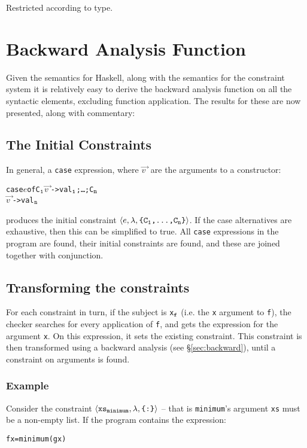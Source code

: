 \documentclass[preprint]{sigplanconf}
\newcommand{\T}[1]{\texttt{#1}}
\newcommand{\tup}[1]{\ensuremath{\langle #1 \rangle}}
\newcounter{exmp}
\newcommand{\yesexample}{\subsubsection*{Example \arabic{exmp}}\addtocounter{exmp}{1}}
\newenvironment{code}{\begin{alltt}\small}{\end{alltt}}
\renewcommand{\c}[3]{\tup{\T{#1},\T{#2},\T{\{#3\}}}}
\newcommand{\cc}[2]{\c{#1}{$\lambda$}{#2}}
\newcommand{\s}[1]{\ensuremath{_{\tt #1}}} %
\newcommand{\vecto}[1]{\overrightarrow{#1\;}}
\begin{document}
Restricted according to type.

\section{Backward Analysis Function}
\label{chap:backward}

Given the semantics for Haskell, along with the semantics for the constraint
system it is relatively easy to derive the backward analysis function on all
the syntactic elements, excluding function application. The results for these
are now presented, along with commentary:

\subsection{The Initial Constraints}

In general, a \T{case} expression, where $\vecto{v}$ are the
arguments to a constructor:

\begin{code}
case \(e\) of {C\s{1} \(\vecto{v}\) -> val\s{1}; \ldots; C\s{n}
\(\vecto{v}\) -> val\s{n}}
\end{code}

\noindent produces the initial constraint
\cc{$e$}{C\s{1},\ldots,C\s{n}}. If the case alternatives are
exhaustive, then this can be simplified to true. All \T{case}
expressions in the program are found, their initial constraints are
found, and these are joined together with conjunction.

\subsection{Transforming the constraints}

For each constraint in turn, if the subject is \T{x\s{f}} (i.e. the
\T{x} argument to \T{f}), the checker searches for every application
of \T{f}, and gets the expression for the argument \T{x}. On this
expression, it sets the existing constraint. This constraint is then
transformed using a backward analysis (see \S\ref{sec:backward}),
until a constraint on arguments is found.

\yesexample

Consider the constraint \cc{xs\s{minimum}}{:} -- that is
\T{minimum}'s argument \T{xs} must be a non-empty list. If the
program contains the expression:

\begin{code}
f x = minimum (g x)
\end{code}
\end{document}
